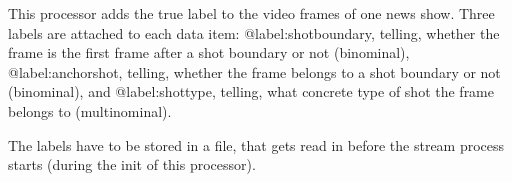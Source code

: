 This processor adds the true label to the video frames of one news show. Three labels are attached to each data item: @label:shotboundary, telling, whether the frame is the first frame after a shot boundary or not (binominal), @label:anchorshot, telling, whether the frame belongs to a shot boundary or not (binominal), and @label:shottype, telling, what concrete type of shot the frame belongs to (multinominal).

The labels have to be stored in a file, that gets read in before the stream process starts (during the init of this processor).